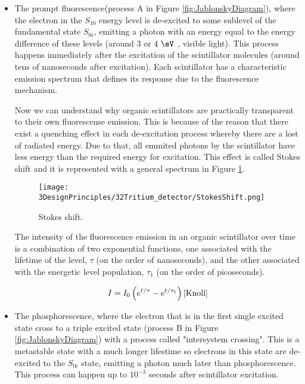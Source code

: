 \begin{itemize}

\item{} The prompt fluorescence(process A in Figure \ref{fig:JablonskyDiagram}), where the electron in the $S_{10}$ energy level  is de-excited to some sublevel of the fundamental state $S_{0i}$, emitting a photon with an energy equal to the energy difference of these levels (around $3$ or $4~\eV$ , visible light). This process happens immediately after the excitation of the scintillator molecules (around tens of nanoseconds after excitation). Each scintillator has a characteristic emission spectrum that defines its response due to the fluorescence mechanism. 

Now we can understand why organic scintillators are practically transparent to their own fluorescense emission. This is because of the reason that there exist a quenching effect in each de-excitation process whereby there are a lost of radiated energy. Due to that, all emmited  photons by the scintillator have less energy than the required energy for excitation. This effect is called Stokes shift and it is represented with a general spectrum in Figure \ref{fig:StokesShift}.

\begin{figure}[htbp]
\centering
\texttt{[image: 3DesignPrinciples/32Tritium\_detector/StokesShift.png]}
\caption{Stokes shift.\label{fig:StokesShift}~\cite{Knoll}}
\end{figure}

The intensity of the fluorescence emission in an organic scintillator over time is a combination of two exponential functions, one associated with the lifetime of the level, $\tau$ (on the order of nanoseconds), and the other associated with the energetic level population, $\tau_1$ (on the order of picoseconds).

\begin{equation}
I=I_0\left(e^{t/\tau} - e^{t/\tau_1}\right) \cite{Knoll}
\label{eq:IntensityTimeScintillator}
\end{equation}

\item{} The phosphorescence, where the electron that is in the first single excited state cross to a triple excited state (process B in Figure \ref{fig:JablonskyDiagram}) with a process called "intersystem crossing". This is a metastable state with a much longer lifestime so electrons in this state are de-excited to the $S_{0i}$ state, emitting a photon much later than phosphorescence. This process can happen up to $10^{-3}$ seconds after scintillator excitation.


\end{itemize}
